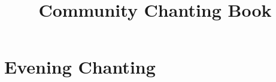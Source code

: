 \documentclass[final]{chantingbook}
\title{Community Chanting Book}
\begin{document}
%
%

\mainmatter


%
%

\part{Evening Chanting}



%
%
%

%
%
%
\end{document}

